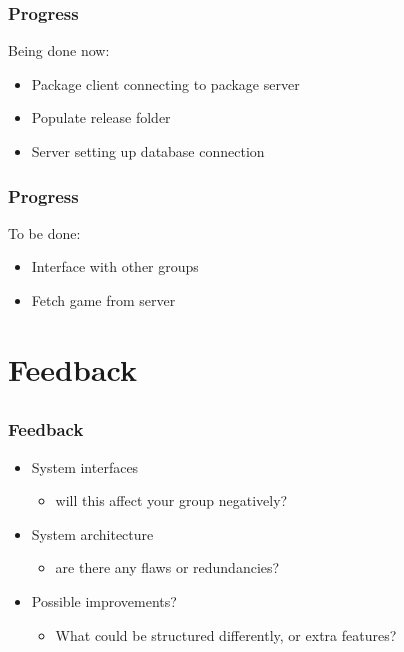 \documentclass{beamer}
\begin{document}
\begin{frame}
    \frametitle{Progress}
    
    Being done now:
    
    \begin{itemize}
        \item   Package client connecting to package server
        \item   Populate release folder
        \item   Server setting up database connection
    \end{itemize}
\end{frame}

\begin{frame}
    \frametitle{Progress}
    
    To be done:
    
    \begin{itemize}
        \item   Interface with other groups
        \item   Fetch game from server
    \end{itemize}
\end{frame}

\section{Feedback} %
\subsection{}

\begin{frame}
    \frametitle{Feedback}
    
    \begin{itemize}
        \item   System interfaces
        \begin{itemize}
            \item   will this affect your group negatively?
        \end{itemize}
        \item   System architecture
        \begin{itemize}
            \item   are there any flaws or redundancies?
        \end{itemize}
        \item   Possible improvements?
        \begin{itemize}
            \item   What could be structured differently, or extra features?
        \end{itemize}
    \end{itemize}
\end{frame}
\end{document}
